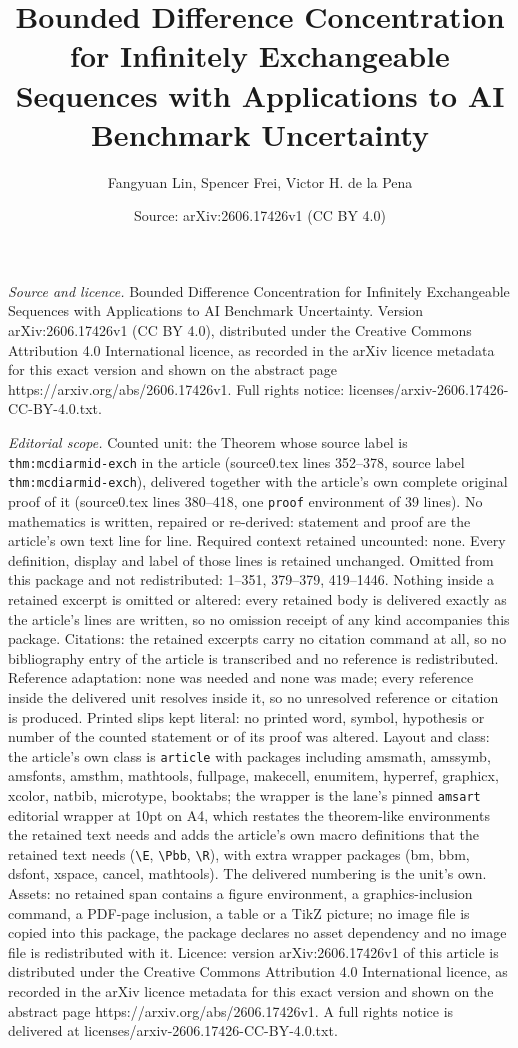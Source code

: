 \documentclass[10pt,a4paper]{amsart}
\title[Bounded Difference Concentration for Infinitely Exchangeable]{Bounded Difference Concentration for Infinitely Exchangeable Sequences with Applications to AI Benchmark Uncertainty}
\author{Fangyuan Lin, Spencer Frei, Victor H. de la Pena}
\date{Source: arXiv:2606.17426v1 (CC BY 4.0)}
\begin{document}
\maketitle

\noindent\emph{Source and licence.} Bounded Difference Concentration for Infinitely Exchangeable Sequences with Applications to AI Benchmark Uncertainty. Version arXiv:2606.17426v1 (CC BY 4.0), distributed under the Creative Commons Attribution 4.0 International licence, as recorded in the arXiv licence metadata for this exact version and shown on the abstract page https://arxiv.org/abs/2606.17426v1. Full rights notice: licenses/arxiv-2606.17426-CC-BY-4.0.txt.\par\smallskip

\noindent\textit{Editorial scope.} Counted unit: the Theorem whose source label is \texttt{thm:mcdiarmid-exch} in the article (source0.tex lines 352--378, source label \texttt{thm:mcdiarmid-exch}), delivered together with the article's own complete original proof of it (source0.tex lines 380--418, one \texttt{proof} environment of 39 lines). No mathematics is written, repaired or re-derived: statement and proof are the article's own text line for line. Required context retained uncounted: none. Every definition, display and label of those lines is retained unchanged. Omitted from this package and not redistributed: 1--351, 379--379, 419--1446. Nothing inside a retained excerpt is omitted or altered: every retained body is delivered exactly as the article's lines are written, so no omission receipt of any kind accompanies this package. Citations: the retained excerpts carry no citation command at all, so no bibliography entry of the article is transcribed and no reference is redistributed. Reference adaptation: none was needed and none was made; every reference inside the delivered unit resolves inside it, so no unresolved reference or citation is produced. Printed slips kept literal: no printed word, symbol, hypothesis or number of the counted statement or of its proof was altered. Layout and class: the article's own class is \texttt{article} with packages including amsmath, amssymb, amsfonts, amsthm, mathtools, fullpage, makecell, enumitem, hyperref, graphicx, xcolor, natbib, microtype, booktabs; the wrapper is the lane's pinned \texttt{amsart} editorial wrapper at 10pt on A4, which restates the theorem-like environments the retained text needs and adds the article's own macro definitions that the retained text needs (\texttt{\textbackslash E}, \texttt{\textbackslash Pbb}, \texttt{\textbackslash R}), with extra wrapper packages (bm, bbm, dsfont, xspace, cancel, mathtools). The delivered numbering is the unit's own. Assets: no retained span contains a figure environment, a graphics-inclusion command, a PDF-page inclusion, a table or a TikZ picture; no image file is copied into this package, the package declares no asset dependency and no image file is redistributed with it. Licence: version arXiv:2606.17426v1 of this article is distributed under the Creative Commons Attribution 4.0 International licence, as recorded in the arXiv licence metadata for this exact version and shown on the abstract page https://arxiv.org/abs/2606.17426v1. A full rights notice is delivered at licenses/arxiv-2606.17426-CC-BY-4.0.txt. 
\end{document}
